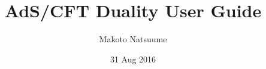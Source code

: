 \documentclass[graybox,envcountchap,sectrefs,12pt]{svmono}
\begin{document}
\author{Makoto Natsuume}
\title{AdS/CFT Duality User Guide}
\date{31 Aug 2016}
\maketitle

\frontmatter%

%
%


%

\tableofcontents




\mainmatter%
	
	   
	
	
	   
	
	   
	
	   
	
	
	   
	
	   
	
	   
	
	   
	
%	   
	   
	   
	
	   
	   
	
	   
	
	   
	
%	
%


\end{document}
